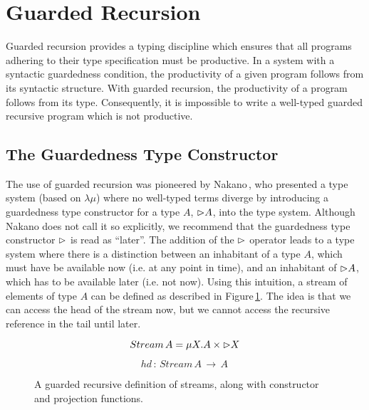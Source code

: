 \section{Guarded Recursion}
\label{sec:guarded-recursion}

Guarded recursion provides a typing discipline which ensures that all programs adhering to their type specification must be productive. In a system with a syntactic guardedness condition, the productivity of a given program follows from its syntactic structure. With guarded recursion, the productivity of a program follows from its type. Consequently, it is impossible to write a well-typed guarded recursive program which is not productive.

\subsection{The Guardedness Type Constructor}
The use of guarded recursion was pioneered by Nakano\,\citep{Nakano:2000}, who presented a type system (based on $\lambda \mu$) where no well-typed terms diverge by introducing a guardedness type constructor for a type $A$, $\rhd A$, into the type system. Although Nakano does not call it so explicitly, we recommend that the guardedness type constructor $\rhd$ is read as ``later''. The addition of the $\rhd$ operator leads to a type system where there is a distinction between an inhabitant of a type $A$, which must have be available now (i.e. at any point in time), and an inhabitant of $\rhd A$, which has to be available later (i.e. not now). Using this intuition, a stream of elements of type $A$ can be defined as described in Figure\,\ref{fig:guarded_recursion_stream}. The idea is that we can access the head of the stream now, but we cannot access the recursive reference in the tail until later.

\begin{figure}
\[
Stream\,A = \mu X. A \times \rhd X
\]

\[
hd \, : \, Stream\,A\, \rightarrow \, A \, 
\]

\caption{A guarded recursive definition of streams, along with constructor and projection functions.}
\label{fig:guarded_recursion_stream}
\end{figure} 


